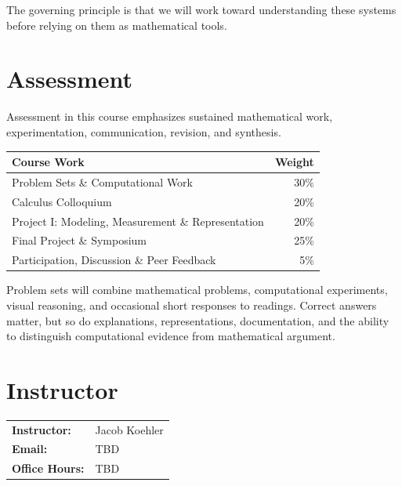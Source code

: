 \documentclass[11pt]{article}
\newcommand{\InstructorName}{Jacob Koehler}
\newcommand{\InstructorEmail}{TBD}
\newcommand{\OfficeHours}{TBD}
\begin{document}
The governing principle is that we will work toward understanding these
systems before relying on them as mathematical tools.


\section{Assessment}

Assessment in this course emphasizes sustained mathematical work,
experimentation, communication, revision, and synthesis.

\begin{tabularx}{\textwidth}{@{}Xr@{}}
\toprule
\textbf{Course Work} & \textbf{Weight} \\
\midrule

Problem Sets \& Computational Work & 30\% \\

Calculus Colloquium & 20\% \\

Project I: Modeling, Measurement \& Representation & 20\% \\

Final Project \& Symposium & 25\% \\

Participation, Discussion \& Peer Feedback & 5\% \\

\bottomrule
\end{tabularx}

\medskip

Problem sets will combine mathematical problems, computational
experiments, visual reasoning, and occasional short responses to
readings. Correct answers matter, but so do explanations, representations,
documentation, and the ability to distinguish computational evidence
from mathematical argument.


\section{Instructor}

\begin{tabularx}{\textwidth}{@{}lX@{}}

\textbf{Instructor:} & \InstructorName \\

\textbf{Email:} & \InstructorEmail \\

\textbf{Office Hours:} & \OfficeHours \\

\end{tabularx}

\clearpage

\end{document}
